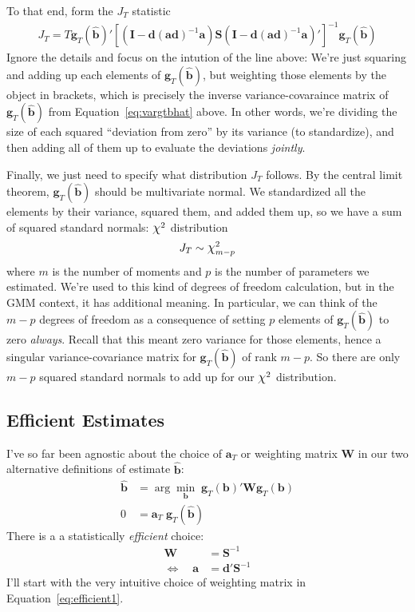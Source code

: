 \documentclass[12pt]{article}
\theoremstyle{plain}
\theoremstyle{definition}
\theoremstyle{remark}
\newcommand*{\Chi}{\mbox{\large$\chi$}} %
\newcommand{\bsb}{\boldsymbol{b}}
\newcommand{\bshatb}{\boldsymbol{\hat{b}}}
\newcommand{\bsd}{\boldsymbol{d}}
\newcommand{\bsg}{\boldsymbol{g}}
\newcommand{\bsS}{\boldsymbol{S}}
\begin{document}
To that end, form the $J_T$ statistic
\begin{align}
  J_T =
  T
  \bsg_T(\bshatb)'
  \left[
  \left(
    \boldsymbol{I}-\bsd(\boldsymbol{a}\bsd)^{-1}
    \boldsymbol{a}
  \right)
  \bsS
  \left(
    \boldsymbol{I}-\bsd(\boldsymbol{a}\bsd)^{-1}
    \boldsymbol{a}
  \right)'
  \right]^{-1}
  \bsg_T(\bshatb)
  \label{eq:jtest}
\end{align}
Ignore the details and focus on the intution of the line above: We're
just squaring and adding up each elements of
$\bsg_T(\bshatb)$, but weighting those elements
by the object in brackets, which is precisely the inverse
variance-covaraince matrix of $\bsg_T(\bshatb)$
from Equation~\ref{eq:vargtbhat} above.  In other words, we're dividing
the size of each squared ``deviation from zero'' by its variance (to
standardize), and then adding all of them up to evaluate the deviations
\emph{jointly}.

Finally, we just need to specify what distribution $J_T$ follows. By the
central limit theorem, $\bsg_T(\bshatb)$ should
be multivariate normal. We standardized all the elements by their
variance, squared them, and added them up, so we have a sum of squared
standard normals: $\Chi^2$ distribution
\begin{align*}
  J_T \sim \Chi^2_{m-p}
\end{align*}
where $m$ is the number of moments and $p$ is the number of parameters
we estimated. We're used to this kind of degrees of freedom calculation,
but in the GMM context, it has additional meaning. In particular, we can
think of the $m-p$ degrees of freedom as a consequence of setting $p$
elements of $\bsg_T(\bshatb)$ to zero
\emph{always}. Recall that this meant zero variance for those elements,
hence a singular variance-covariance matrix for
$\bsg_T(\bshatb)$ of rank $m-p$. So there are
only $m-p$ squared standard normals to add up for our $\Chi^2$
distribution.

\clearpage
\subsection{Efficient Estimates}

I've so far been agnostic about the choice of $\boldsymbol{a}_T$ or
weighting matrix $\boldsymbol{W}$ in our two alternative definitions of
estimate $\bshatb$:
\begin{align}
  \bshatb &= \arg\min_{\bsb}\;
  \bsg_T(\bsb)' \boldsymbol{W}
  \bsg_T(\bsb)
  \label{eq:bhatmin2}\\
  0 &= \boldsymbol{a}_T
    \;
    \bsg_T(\bshatb)
  \label{eq:bhatdef2}
\end{align}
There is a a statistically \emph{efficient} choice:
\begin{align}
  \boldsymbol{W} &= \bsS^{-1} \label{eq:efficient1}\\
  \Leftrightarrow \quad
  \boldsymbol{a} &= \bsd' \bsS^{-1}
  \label{eq:efficient2}
\end{align}
I'll start with the very intuitive choice of weighting matrix in
Equation~\ref{eq:efficient1}.
\end{document}
